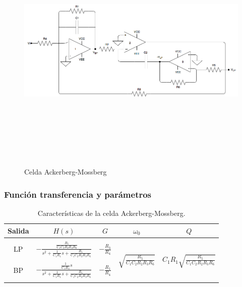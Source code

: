 \begin{figure}[H] %
	\centering
	\includegraphics[width=12cm,height=12cm,keepaspectratio]{../EJ4/imagenes/ACKBERG.png}
	\caption{Celda Ackerberg-Mossberg}
	\label{ackerberg}
\end{figure}

\subsubsection{Funci\'on transferencia y par\'ametros}

\begin{table}[H] %
	\centering
	\begin{tabular}{c c c c c}
		Salida & $H(s)$ & $G$ & $\omega_0$ & $Q$\\
		\hline \\
		LP & $- \frac{\frac{R_5}{C_1C_2R_2R_4R_6}}{s^2+\frac{1}{C_1R_1}s+\frac{R_5}{C_1C_2R_2R_3R_6}}$& $-\frac{R_3}{R_4}$& \multirow{4}{*}{$\sqrt{\frac{R_5}{C_1C_2R_2R_3R_6}}$}&
		\multirow{4}{*}{$C_1R_1\sqrt{\frac{R_5}{C_1C_2R_2R_3R_6}}$}\\ \\
		BP & $-\frac{\frac{1}{C_1R_4}s}{s^2+\frac{1}{C_1R_1}s + \frac{R_5}{C_1C_2R_2R_3R_6}}$&$-\frac{R_1}{R_4}$& &\\ \\
		\hline
	\end{tabular}
	\caption{Caracter\'isticas de la celda Ackerberg-Mossberg.}
	\label{am_tt}
\end{table}

